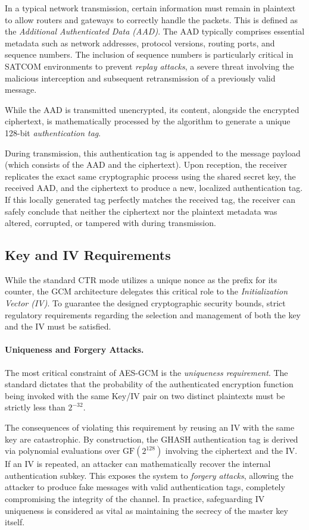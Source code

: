 \documentclass[11pt,a4paper]{report}
\begin{document}
In a typical network transmission, certain information must remain in plaintext to allow routers and gateways to correctly handle the packets. 
This is defined as the \textit{Additional Authenticated Data (AAD)}. 
The AAD typically comprises essential metadata such as network addresses, protocol versions, routing ports, and sequence numbers. 
The inclusion of sequence numbers is particularly critical in SATCOM environments to prevent \textit{replay attacks}, a severe threat involving the malicious interception and subsequent retransmission of a previously valid message.

While the AAD is transmitted unencrypted, its content, alongside the encrypted ciphertext, is mathematically processed by the algorithm to generate a unique 128-bit \textit{authentication tag}. 

During transmission, this authentication tag is appended to the message payload (which consists of the AAD and the ciphertext). 
Upon reception, the receiver replicates the exact same cryptographic process using the shared secret key, the received AAD, and the ciphertext to produce a new, localized authentication tag. 
If this locally generated tag perfectly matches the received tag, the receiver can safely conclude that neither the ciphertext nor the plaintext metadata was altered, corrupted, or tampered with during transmission.


\subsection{Key and IV Requirements}
While the standard CTR mode utilizes a unique nonce as the prefix for its counter, the GCM architecture delegates this critical role to the \textit{Initialization Vector (IV)}. 
To guarantee the designed cryptographic security bounds, strict regulatory requirements regarding the selection and management of both the key and the IV must be satisfied.

\paragraph{Uniqueness and Forgery Attacks.}
The most critical constraint of AES-GCM is the \textit{uniqueness requirement}. The standard dictates that the probability of the authenticated encryption function being invoked with the same Key/IV pair on two distinct plaintexts must be strictly less than $2^{-32}$. 

The consequences of violating this requirement by reusing an IV with the same key are catastrophic. By construction, the GHASH authentication tag is derived via polynomial evaluations over $\mathrm{GF}(2^{128})$ involving the ciphertext and the IV. 
If an IV is repeated, an attacker can mathematically recover the internal authentication subkey. This exposes the system to \textit{forgery attacks}, allowing the attacker to produce fake messages with valid authentication tags, completely compromising the integrity of the channel. 
In practice, safeguarding IV uniqueness is considered as vital as maintaining the secrecy of the master key itself.
\end{document}
